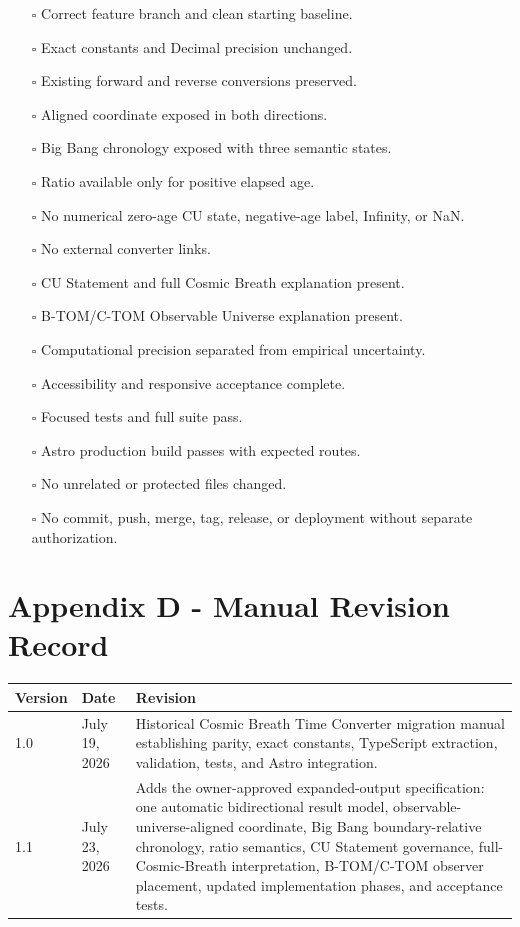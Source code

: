 \documentclass[11pt,letterpaper]{article}
\newcommand{\checkbox}{\(\square\)}
\begin{document}
\begin{itemize}
    \item[\checkbox] Correct feature branch and clean starting baseline.
    \item[\checkbox] Exact constants and Decimal precision unchanged.
    \item[\checkbox] Existing forward and reverse conversions preserved.
    \item[\checkbox] Aligned coordinate exposed in both directions.
    \item[\checkbox] Big Bang chronology exposed with three semantic states.
    \item[\checkbox] Ratio available only for positive elapsed age.
    \item[\checkbox] No numerical zero-age CU state, negative-age label, Infinity, or NaN.
    \item[\checkbox] No external converter links.
    \item[\checkbox] CU Statement and full Cosmic Breath explanation present.
    \item[\checkbox] B-TOM/C-TOM Observable Universe explanation present.
    \item[\checkbox] Computational precision separated from empirical uncertainty.
    \item[\checkbox] Accessibility and responsive acceptance complete.
    \item[\checkbox] Focused tests and full suite pass.
    \item[\checkbox] Astro production build passes with expected routes.
    \item[\checkbox] No unrelated or protected files changed.
    \item[\checkbox] No commit, push, merge, tag, release, or deployment without separate authorization.
\end{itemize}

\section{Appendix D - Manual Revision Record}

\begin{tabularx}{\textwidth}{L{0.75in}L{1.25in}Y}
\toprule
\textbf{Version} & \textbf{Date} & \textbf{Revision} \\
 & July 19, 2026 & Historical Cosmic Breath Time Converter migration manual establishing parity, exact constants, TypeScript extraction, validation, tests, and Astro integration. \\
1.1 & July 23, 2026 & Adds the owner-approved expanded-output specification: one automatic bidirectional result model, observable-universe-aligned coordinate, Big Bang boundary-relative chronology, ratio semantics, CU Statement governance, full-Cosmic-Breath interpretation, B-TOM/C-TOM observer placement, updated implementation phases, and acceptance tests. \\
\bottomrule
\end{tabularx}
\end{document}
